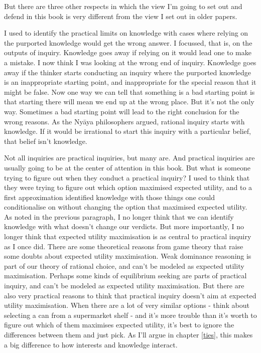 \documentclass[
  11pt,
]{book}
\begin{document}
But there are three other respects in which the view I'm going to set out and defend in this book is very different from the view I set out in older papers.

I used to identify the practical limits on knowledge with cases where relying on the purported knowledge would get the wrong answer. I focussed, that is, on the outputs of inquiry. Knowledge goes away if relying on it would lead one to make a mistake. I now think I was looking at the wrong end of inquiry. Knowledge goes away if the thinker starts conducting an inquiry where the purported knowledge is an inappropriate starting point, and inappropriate for the special reason that it might be false. Now one way we can tell that something is a bad starting point is that starting there will mean we end up at the wrong place. But it's not the only way. Sometimes a bad starting point will lead to the right conclusion for the wrong reasons. As the Nyāya philosophers argued, rational inquiry starts with knowledge. If it would be irrational to start this inquiry with a particular belief, that belief isn't knowledge.

Not all inquiries are practical inquiries, but many are. And practical inquiries are usually going to be at the center of attention in this book. But what is someone trying to figure out when they conduct a practical inquiry? I used to think that they were trying to figure out which option maximised expected utility, and to a first approximation identified knowledge with those things one could conditionalise on without changing the option that maximised expected utility. As noted in the previous paragraph, I no longer think that we can identify knowledge with what doesn't change our verdicts. But more importantly, I no longer think that expected utility maximisation is as central to practical inquiry as I once did. There are some theoretical reasons from game theory that raise some doubts about expected utility maximisation. Weak dominance reasoning is part of our theory of rational choice, and can't be modeled as expected utility maximisation. Perhaps some kinds of equilibrium seeking are parts of practical inquiry, and can't be modeled as expected utility maximisation. But there are also very practical reasons to think that practical inquiry doesn't aim at expected utility maximisation. When there are a lot of very similar options - think about selecting a can from a supermarket shelf - and it's more trouble than it's worth to figure out which of them maximises expected utility, it's best to ignore the differences between them and just pick. As I'll argue in chapter \ref{ties}, this makes a big difference to how interests and knowledge interact.
\end{document}
